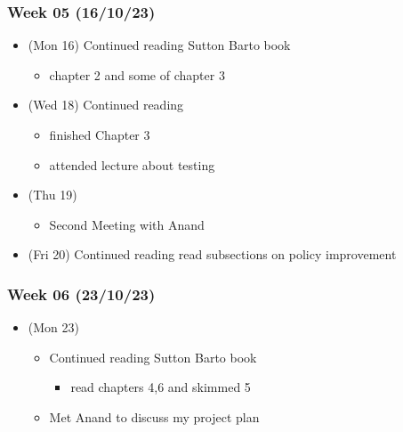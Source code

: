 \hypertarget{week-05-161023}{%
  \subsubsection{Week 05 (16/10/23)}\label{week-05-161023}}

\begin{itemize}
  \tightlist
  \item
        (Mon 16) Continued reading Sutton Barto book

        \begin{itemize}
          \tightlist
          \item
                chapter 2 and some of chapter 3
        \end{itemize}
  \item
        (Wed 18) Continued reading

        \begin{itemize}
          \tightlist
          \item
                finished Chapter 3
          \item
                attended lecture about testing
        \end{itemize}
  \item
        (Thu 19)

        \begin{itemize}
          \tightlist
          \item
                Second Meeting with Anand
        \end{itemize}
  \item
        (Fri 20) Continued reading read subsections on policy improvement
\end{itemize}

\hypertarget{week-06-231023}{%
  \subsubsection{Week 06 (23/10/23)}\label{week-06-231023}}

\begin{itemize}
  \tightlist
  \item
        (Mon 23)

        \begin{itemize}
          \tightlist
          \item
                Continued reading Sutton Barto book

                \begin{itemize}
                  \tightlist
                  \item
                        read chapters 4,6 and skimmed 5
                \end{itemize}
          \item
                Met Anand to discuss my project plan
        \end{itemize}
\end{itemize}

